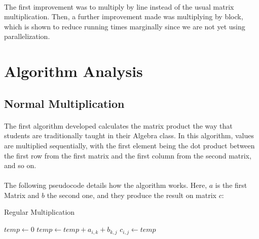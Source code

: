 \documentclass[11pt]{report}
\begin{document}
    \paragraph{}The first improvement was to multiply by line instead of the usual matrix multiplication. Then, a further improvement made was multiplying by block, which is shown to reduce running times marginally since we are not yet using parallelization.

    \newpage

    \section*{Algorithm Analysis}

    \subsection*{Normal Multiplication}

    \paragraph{}The first algorithm developed calculates the matrix product the way that students are traditionally taught in their Algebra class. In this algorithm, values are multiplied sequentially, with the first element being the dot product between the first row from the first matrix and the first column from the second matrix, and so on.

    \paragraph{}The following pseudocode details how the algorithm works. Here, $a$ is the first Matrix and $b$ the second one, and they produce the result on matrix $c$:

    \begin{algorithm}
      \caption{Regular Multiplication}\label{euclid}
      \begin{algorithmic}[1]
        \State $temp \leftarrow 0$
        \State $temp \leftarrow temp + a_{i, k} + b_{k, j}$
        \EndFor
        \State $c_{i, j} \leftarrow temp$
        \EndFor
        \EndFor
        \EndProcedure
      \end{algorithmic}
    \end{algorithm}
\end{document}
